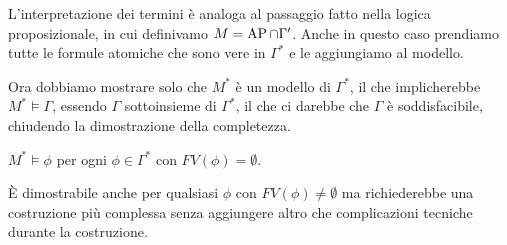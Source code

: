 L'interpretazione dei termini è analoga al passaggio fatto nella logica proposizionale, in cui definivamo \(M = \AP\cap\Gamma'\). Anche in questo caso prendiamo tutte le formule atomiche che sono vere in \(\Gamma^*\) e le aggiungiamo al modello.

Ora dobbiamo mostrare solo che \(M^*\) è un modello di \(\Gamma^*\), il che implicherebbe \(M^*\models \Gamma\), essendo \(\Gamma\) sottoinsieme di \(\Gamma^*\), il che ci darebbe che \(\Gamma\) è soddisfacibile, chiudendo la dimostrazione della completezza.

\begin{theorem}{}
  \(M^* \models \phi\) per ogni \(\phi \in \Gamma^*\) con \(FV(\phi) = \emptyset\).
\end{theorem}

\begin{note}{}
  È dimostrabile anche per qualsiasi \(\phi\) con \(FV(\phi) \neq \emptyset\) ma richiederebbe una costruzione più complessa senza aggiungere altro che complicazioni tecniche durante la costruzione.
\end{note}

